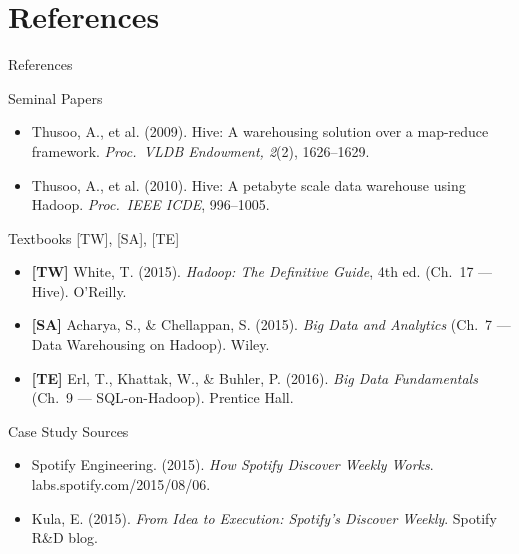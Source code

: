 \documentclass[aspectratio=169,10pt]{beamer}
\begin{document}
\section*{References}

\begin{frame}{References}
  \begin{block}{Seminal Papers}
    \begin{itemize}
      \item Thusoo, A., et al. (2009).
            Hive: A warehousing solution over a map-reduce framework.
            \textit{Proc.\ VLDB Endowment, 2}(2), 1626--1629.
      \item Thusoo, A., et al. (2010).
            Hive: A petabyte scale data warehouse using Hadoop.
            \textit{Proc.\ IEEE ICDE}, 996--1005.
    \end{itemize}
  \end{block}
  \vspace{4pt}
  \begin{block}{Textbooks \textmd{[TW], [SA], [TE]}}
    \begin{itemize}
      \item \textbf{[TW]} White, T. (2015).
            \textit{Hadoop: The Definitive Guide}, 4th ed.
            (Ch.~17 — Hive). O'Reilly.
      \item \textbf{[SA]} Acharya, S., \& Chellappan, S. (2015).
            \textit{Big Data and Analytics}
            (Ch.~7 — Data Warehousing on Hadoop). Wiley.
      \item \textbf{[TE]} Erl, T., Khattak, W., \& Buhler, P. (2016).
            \textit{Big Data Fundamentals}
            (Ch.~9 — SQL-on-Hadoop). Prentice Hall.
    \end{itemize}
  \end{block}
  \vspace{4pt}
  \begin{block}{Case Study Sources}
    \begin{itemize}
      \item Spotify Engineering. (2015).
            \textit{How Spotify Discover Weekly Works}.
            labs.spotify.com/2015/08/06.
      \item Kula, E. (2015).
            \textit{From Idea to Execution: Spotify's Discover Weekly}.
            Spotify R\&D blog.
    \end{itemize}
  \end{block}
\end{frame}
\end{document}
